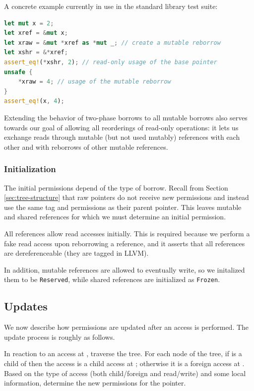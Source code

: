 \documentclass[a4paper,11pt]{article}
\theoremstyle{plain}
\theoremstyle{definition}
\theoremstyle{remark}
\newcommand{\tcode}[1]{\rstinline{#1}}
\newcommand{\tperm}[1]{\texttt{#1}}
\begin{document}
A concrete example currently in use in the standard library test suite:
\begin{lstlisting}[language=rust]
let mut x = 2;
let xref = &mut x;
let xraw = &mut *xref as *mut _; // create a mutable reborrow
let xshr = &*xref;
assert_eq!(*xshr, 2); // read-only usage of the base pointer
unsafe {
    *xraw = 4; // usage of the mutable reborrow
}
assert_eq!(x, 4);
\end{lstlisting}

Extending the behavior of two-phase borrows to all mutable borrows also serves
towards our goal of allowing all reorderings of read-only operations: it lets
us exchange reads through mutable (but not used mutably) references with each
other and with reborrows of other mutable references.

\subsubsection{Initialization}

The initial permissions depend of the type of borrow.
Recall from Section \ref{sec:tree-structure} that raw pointers do not receive new permissions and instead
use the same tag and permissions as their parent pointer. This leaves mutable and
shared references for which we must determine an initial permission.

All references allow read accesses initially. This is required
because we perform a fake read access upon reborrowing a reference, and it asserts
that all references are dereferenceable (they are tagged \tcode{dereferenceable}
in LLVM).

In addition, mutable references are allowed to eventually write,
so we initalized them to be \tperm{Reserved}, while shared references are
initialized as \tperm{Frozen}.

\subsection{Updates}
\label{sec:transitions}

We now describe how permissions are updated after an access is performed.
The update process is roughly as follows.

In reaction to an access at \tcode{t0}, traverse the tree. For each \tcode{t1} node of the
tree, if \tcode{t0} is a child of \tcode{t1} then the access is a child access at \tcode{t1}; otherwise
it is a foreign access at \tcode{t1}. Based on the type of access (both child/foreign
and read/write) and some local information, determine the new permissions for the
pointer.
\end{document}
